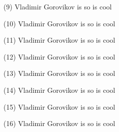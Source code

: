 \documentclass{article}%
\begin{document}
\begin{minipage}{0.3333333333333333\textwidth}%
(9) Vladimir Gorovikov%
\newline%
%
is so%
\newline%
%
is cool%
\newline%
%
\end{minipage}%
\newline%
\begin{minipage}{0.3333333333333333\textwidth}%
(10) Vladimir Gorovikov%
\newline%
%
is so%
\newline%
%
is cool%
\newline%
%
\end{minipage}%
\begin{minipage}{0.3333333333333333\textwidth}%
(11) Vladimir Gorovikov%
\newline%
%
is so%
\newline%
%
is cool%
\newline%
%
\end{minipage}%
\begin{minipage}{0.3333333333333333\textwidth}%
(12) Vladimir Gorovikov%
\newline%
%
is so%
\newline%
%
is cool%
\newline%
%
\end{minipage}%
\newline%
\begin{minipage}{0.3333333333333333\textwidth}%
(13) Vladimir Gorovikov%
\newline%
%
is so%
\newline%
%
is cool%
\newline%
%
\end{minipage}%
\begin{minipage}{0.3333333333333333\textwidth}%
(14) Vladimir Gorovikov%
\newline%
%
is so%
\newline%
%
is cool%
\newline%
%
\end{minipage}%
\begin{minipage}{0.3333333333333333\textwidth}%
(15) Vladimir Gorovikov%
\newline%
%
is so%
\newline%
%
is cool%
\newline%
%
\end{minipage}%
\newline%
\begin{minipage}{0.3333333333333333\textwidth}%
(16) Vladimir Gorovikov%
\newline%
%
is so%
\newline%
%
is cool%
\newline%
%
\end{minipage}%
\end{document}

